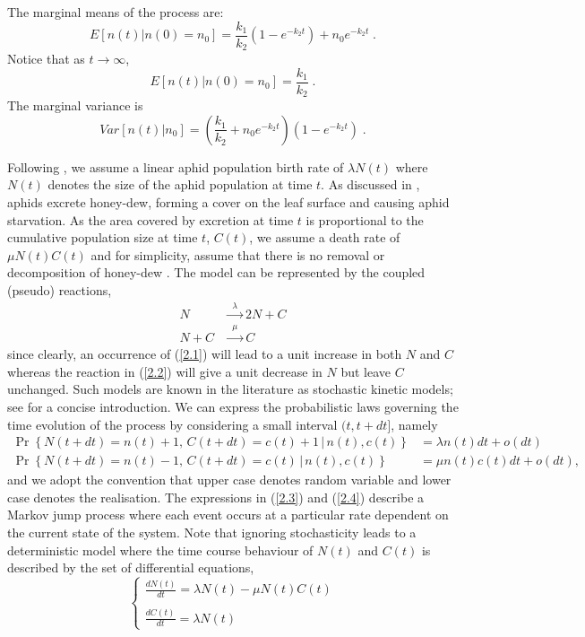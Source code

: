 \documentclass{pnastwo}
\begin{document}
\begin{article}
The marginal means of the process are:
\[
E[n(t) | n(0) = n_0 ] = \frac{k_1}{k_2}(1-e^{-k_2 t}) + n_0 e^{-k_2 t} \;.
\]
Notice that as $t \rightarrow \infty$,
\[
E[n(t) | n(0) = n_0 ] = \frac{k_1}{k_2} \;.
\]
The marginal variance is
\[
Var[n(t) | n_0]  = \left(\frac{k_1}{k_2} + n_0e^{-k_2 t}\right)(1-e^{-k_2 t}) \;.
\]




Following \cite{Matis06}, we assume a linear aphid population birth rate of $\lambda N(t)$ where $N(t)$ denotes the size of the aphid population at time $t$. As discussed in \cite{Prajneshu98}, aphids excrete honey-dew, forming a cover on the leaf surface and causing aphid starvation. As the area covered by excretion at time $t$ is proportional to the cumulative population size at time $t$, $C(t)$, we assume a death rate of $\mu N(t)C(t)$ and for simplicity, assume that there is no removal or decomposition of honey-dew \cite{Matis06,Matis07a,Matis08}. The model can be represented by the coupled (pseudo) reactions, 
\begin{align}
N & \xrightarrow{\phantom{a}\lambda\phantom{a}} 2N + C \label{2.1} \\
N+C & \xrightarrow{\phantom{a}\mu\phantom{a}} C \label{2.2}
\end{align}
since clearly, an occurrence of (\ref{2.1}) will lead to a unit increase in both $N$ and $C$ whereas the reaction in  (\ref{2.2}) will give a unit decrease in $N$ but leave $C$ unchanged. Such models are known in the literature as stochastic kinetic models; see \cite{Wilkinson06} for a concise introduction. We can express the probabilistic laws governing the time evolution of the process by considering a small interval $(t,t+dt]$, namely
\begin{align}
\Pr\left\{N(t+dt)=n(t)+1,\,C(t+dt)=c(t)+1\,|\,n(t),c(t)\right\}&=\lambda n(t)dt+o(dt) \label{2.3} \\
\Pr\left\{N(t+dt)=n(t)-1,\,C(t+dt)=c(t)\,|\,n(t),c(t)\right\}&=\mu n(t)c(t)dt+o(dt),\label{2.4}
\end{align}
and we adopt the convention that upper case denotes random variable and lower case denotes the realisation. The expressions in (\ref{2.3}) and (\ref{2.4}) describe a Markov jump process where each event occurs at a particular rate dependent on the current state of the system. Note that ignoring stochasticity leads to a deterministic model where the time course behaviour of $N(t)$ and $C(t)$ is described by the set of differential equations,
\[
\left\{\begin{array}{l}
\displaystyle\frac{dN(t)}{dt}=\lambda N(t)-\mu N(t)C(t)\\
\\
\displaystyle\frac{dC(t)}{dt}= \lambda N(t)
\end{array}\right.
\] 




\end{article}
\end{document}
